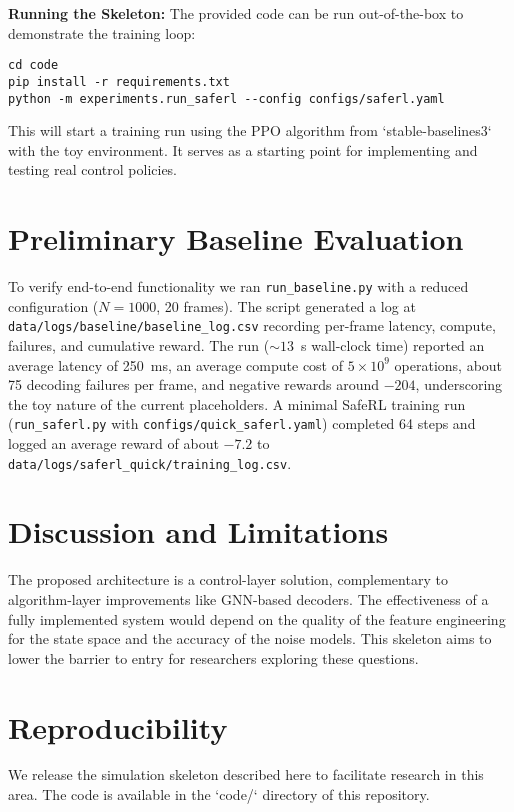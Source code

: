 \documentclass[conference]{IEEEtran}
\begin{document}
\textbf{Running the Skeleton:} The provided code can be run out-of-the-box to demonstrate the training loop:
\begin{verbatim}
cd code
pip install -r requirements.txt
python -m experiments.run_saferl --config configs/saferl.yaml
\end{verbatim}
This will start a training run using the PPO algorithm from `stable-baselines3` with the toy environment. It serves as a starting point for implementing and testing real control policies.

\section{Preliminary Baseline Evaluation}
To verify end-to-end functionality we ran \texttt{run\_baseline.py} with a reduced configuration ($N=1000$, 20 frames). The script generated a log at \texttt{data/logs/baseline/baseline\_log.csv} recording per-frame latency, compute, failures, and cumulative reward. The run (\(\sim13\)~s wall-clock time) reported an average latency of \SI{250}{ms}, an average compute cost of $5\times10^9$ operations, about 75 decoding failures per frame, and negative rewards around $-204$, underscoring the toy nature of the current placeholders. A minimal SafeRL training run (\texttt{run\_saferl.py} with \texttt{configs/quick\_saferl.yaml}) completed 64 steps and logged an average reward of about $-7.2$ to \texttt{data/logs/saferl\_quick/training\_log.csv}.

\section{Discussion and Limitations}
The proposed architecture is a control-layer solution, complementary to algorithm-layer improvements like GNN-based decoders. The effectiveness of a fully implemented system would depend on the quality of the feature engineering for the state space and the accuracy of the noise models. This skeleton aims to lower the barrier to entry for researchers exploring these questions.

\section{Reproducibility}
We release the simulation skeleton described here to facilitate research in this area. The code is available in the `code/` directory of this repository.



\end{document}
